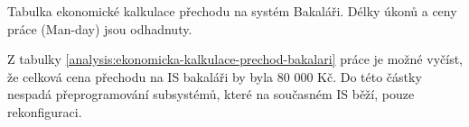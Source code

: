 \documentclass[FM,Proj]{tulthesis}
\begin{document}
\begin{table}[H]
    \caption{Tabulka ekonomické kalkulace přechodu na systém Bakaláři. 
    Délky úkonů a ceny práce (Man-day) jsou odhadnuty.}
    \label{analysis:ekonomicka-kalkulace-prechod-bakalari}
\end{table}

Z tabulky \ref{analysis:ekonomicka-kalkulace-prechod-bakalari} práce je možné vyčíst,
že celková cena přechodu na IS bakaláři by byla 80 000 Kč. Do této částky nespadá 
přeprogramování subsystémů, které na současném IS běží, pouze rekonfiguraci.

% 
% 
% 
% 
%     
% 
% 
\end{document}
